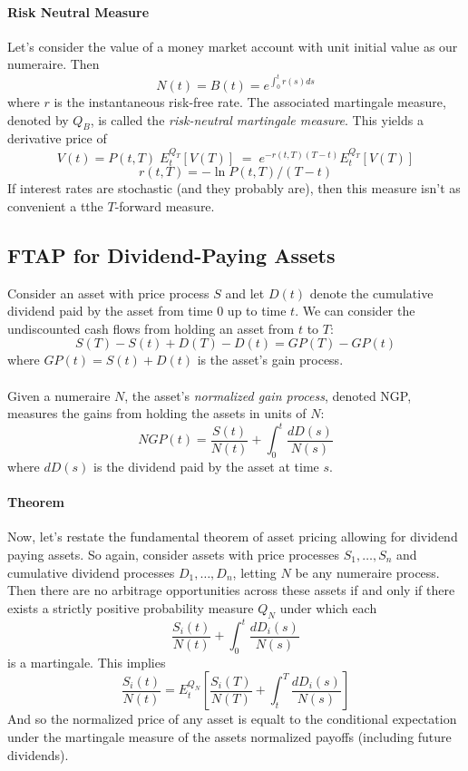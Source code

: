 \documentclass[12pt]{article}
\theoremstyle{plain}
\theoremstyle{definition}
\theoremstyle{remark}
\begin{document}
\paragraph{Risk Neutral Measure} Let's consider the value of a money
market account with unit initial value as our numeraire.  Then
   \[ N(t) = B(t) = e^{\int_0^t r(s) ds} \]
where $r$ is the instantaneous risk-free rate.  The associated 
martingale measure, denoted by $Q_B$, is called the 
\emph{risk-neutral martingale measure}. This yields a derivative price
of 
   \[ V(t) = P(t,T) \; E_t^{Q_T}\left[V(T)\right] \; = \;
      e^{-r(t,T) (T-t)} E_t^{Q_T}\left[V(T)\right] \]
   \[ r(t,T) = -\ln{P(t,T)}/(T-t) \]
If interest rates are stochastic (and they probably are), then this
measure isn't as convenient a tthe $T$-forward measure.

\subsection{FTAP for Dividend-Paying Assets}

Consider an asset with price process $S$ and let $D(t)$ denote the
cumulative dividend paid by the asset from time 0 up to time $t$.
We can consider the undiscounted cash flows from holding an asset
from $t$ to $T$:
   \[ S(T) - S(t) + D(T) - D(t) = GP(T) - GP(t) \]
where $GP(t) = S(t) + D(t)$ is the asset's gain process.
\\
\\
Given a numeraire $N$, the asset's \emph{normalized gain process},
denoted NGP, measures the gains from holding the assets in units of $N$:
\[ NGP(t) = \frac{S(t)}{N(t)} + \int^t_0 \frac{dD(s)}{N(s)}\]
where $dD(s)$ is the dividend paid by the asset at time $s$.

\paragraph{Theorem} Now, let's restate the fundamental theorem of asset
pricing allowing for dividend paying assets.  So again, consider
assets with price processes $S_1, \ldots, S_n$ and cumulative dividend
processes $D_1,\ldots,D_n$, letting $N$ be any numeraire process.
Then there are no arbitrage opportunities across these assets if and
only if there exists a strictly positive probability measure $Q_N$ 
under which each
   \[ \frac{S_i(t)}{N(t)} + \int^t_0 \frac{dD_i(s)}{N(s)} \]
is a martingale. This implies
\[ \frac{S_i(t)}{N(t)}  = E_t^{Q_N}\left[ \frac{S_i(T)}{N(T)} +
   \int^T_t \frac{dD_i(s)}{N(s)}\right] \]
And so the normalized price of any asset is equalt to the conditional
expectation under the martingale measure of the assets normalized payoffs
(including future dividends).
\end{document}
